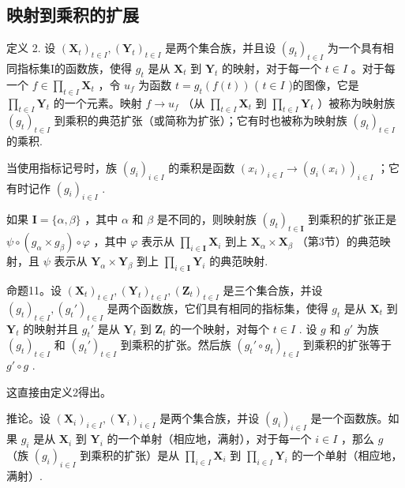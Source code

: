 \subsection{映射到乘积的扩展}

定义 2. 设 \((\mathbf{X}_t)_{t \in I}, (\mathbf{Y}_t)_{t \in I}\) 是两个集合族，并且设 \((g_t)_{t \in I}\) 为一个具有相同指标集I的函数族，使得 \(g_t\) 是从 \(\mathbf{X}_t\) 到 \(\mathbf{Y}_t\) 的映射，对于每一个 \(t \in I\) 。对于每一个 \(f \in \prod_{t \in I} \mathbf{X}_t\) ，令 \(u_f\) 为函数 \(t = g_t(f(t))\) ( \(t \in I\) )的图像，它是 \(\prod_{t \in I} \mathbf{Y}_t\) 的一个元素。映射 \(f \to u_f\) （从 \(\prod_{t \in I} \mathbf{X}_t\) 到 \(\prod_{t \in I} \mathbf{Y}_t\) ）被称为映射族 \((g_t)_{t \in I}\) 到乘积的典范扩张（或简称为扩张）；它有时也被称为映射族 \((g_t)_{t \in I}\) 的乘积.

当使用指标记号时，族 \((g_{i})_{i\in I}\) 的乘积是函数 \((x_{i})_{i\in I}\to (g_{i}(x_{i}))_{i\in I}\) ；它有时记作 \((g_{i})_{i\in I}\) .

如果 \(\mathbf{I} = \{\alpha, \beta\}\) ，其中 \(\alpha\) 和 \(\beta\) 是不同的，则映射族 \((g_t)_{t \in \mathbf{I}}\) 到乘积的扩张正是 \(\psi \circ (g_\alpha \times g_\beta) \circ \varphi\) ，其中 \(\varphi\) 表示从 \(\prod_{i \in \mathbf{I}} \mathbf{X}_i\) 到上 \(\mathbf{X}_\alpha \times \mathbf{X}_\beta\) （第3节）的典范映射，且 \(\psi\) 表示从 \(\mathbf{Y}_\alpha \times \mathbf{Y}_\beta\) 到上 \(\prod_{i \in \mathbf{I}} \mathbf{Y}_i\) 的典范映射.

命题11。设 \((\mathbf{X}_t)_{t \in I}, (\mathbf{Y}_t)_{t \in I}, (\mathbf{Z}_t)_{t \in I}\) 是三个集合族，并设 \((g_t)_{t \in I}, (g_t')_{t \in I}\) 是两个函数族，它们具有相同的指标集，使得 \(g_t\) 是从 \(\mathbf{X}_t\) 到 \(\mathbf{Y}_t\) 的映射并且 \(g_t'\) 是从 \(\mathbf{Y}_t\) 到 \(\mathbf{Z}_t\) 的一个映射，对每个 \(t \in I\) . 设 \(g\) 和 \(g'\) 为族 \((g_t)_{t \in I}\) 和 \((g_t')_{t \in I}\) 到乘积的扩张。然后族 \((g_t' \circ g_t)_{t \in I}\) 到乘积的扩张等于 \(g'\circ g\) .

这直接由定义2得出。

推论。设 \((\mathbf{X}_i)_{i\in I}, (\mathbf{Y}_i)_{i\in I}\) 是两个集合族，并设 \((g_i)_{i\in I}\) 是一个函数族。如果 \(g_i\) 是从 \(\mathbf{X}_i\) 到 \(\mathbf{Y}_i\) 的一个单射（相应地，满射），对于每一个 \(i\in I\) ，那么 \(g\) （族 \((g_i)_{i\in I}\) 到乘积的扩张）是从 \(\prod_{i\in I} \mathbf{X}_i\) 到 \(\prod_{i\in I} \mathbf{Y}_i\) 的一个单射（相应地，满射）.


